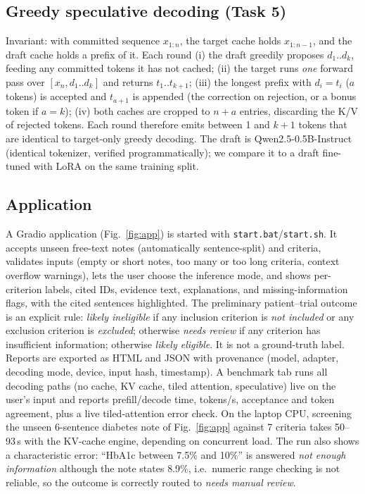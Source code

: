 \documentclass[conference]{IEEEtran}
\begin{document}
\subsection{Greedy speculative decoding (Task 5)}\label{sec:specmethod}
Invariant: with committed sequence $x_{1:n}$, the target cache holds $x_{1:n-1}$, and the draft cache holds a prefix of it. Each round (i) the draft greedily proposes $d_1..d_k$, feeding any committed tokens it has not cached; (ii) the target runs \emph{one} forward pass over $[x_n,d_1..d_k]$ and returns $t_1..t_{k+1}$; (iii) the longest prefix with $d_i=t_i$ ($a$ tokens) is accepted and $t_{a+1}$ is appended (the correction on rejection, or a bonus token if $a{=}k$); (iv) both caches are cropped to $n+a$ entries, discarding the K/V of rejected tokens. Each round therefore emits between 1 and $k{+}1$ tokens that are identical to target-only greedy decoding. The draft is Qwen2.5-0.5B-Instruct (identical tokenizer, verified programmatically); we compare it to a draft fine-tuned with LoRA on the same training split.

\subsection{Application}
A Gradio application (Fig.~\ref{fig:app}) is started with \texttt{start.bat}/\texttt{start.sh}. It accepts unseen free-text notes (automatically sentence-split) and criteria, validates inputs (empty or short notes, too many or too long criteria, context overflow warnings), lets the user choose the inference mode, and shows per-criterion labels, cited IDs, evidence text, explanations, and missing-information flags, with the cited sentences highlighted. The preliminary patient--trial outcome is an explicit rule: \emph{likely ineligible} if any inclusion criterion is \emph{not included} or any exclusion criterion is \emph{excluded}; otherwise \emph{needs review} if any criterion has insufficient information; otherwise \emph{likely eligible}. It is not a ground-truth label. Reports are exported as HTML and JSON with provenance (model, adapter, decoding mode, device, input hash, timestamp). A benchmark tab runs all decoding paths (no cache, KV cache, tiled attention, speculative) live on the user's input and reports prefill/decode time, tokens/s, acceptance and token agreement, plus a live tiled-attention error check. On the laptop CPU, screening the unseen 6-sentence diabetes note of Fig.~\ref{fig:app} against 7 criteria takes 50--93\,s with the KV-cache engine, depending on concurrent load. The run also shows a characteristic error: ``HbA1c between 7.5\% and 10\%'' is answered \emph{not enough information} although the note states 8.9\%, i.e.\ numeric range checking is not reliable, so the outcome is correctly routed to \emph{needs manual review}.
\end{document}

